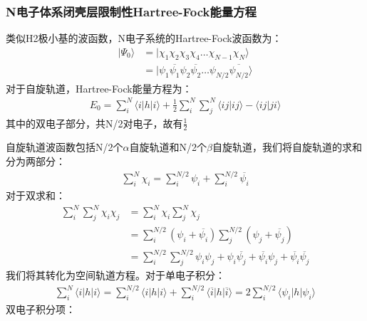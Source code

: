 \documentclass[12pt, a4paper, oneside]{ctexart}
\begin{document}
\subsubsection{N电子体系闭壳层限制性Hartree-Fock能量方程}
类似H2极小基的波函数，N电子系统的Hartree-Fock波函数为：
\begin{equation}
\begin{aligned}
|\Psi_0\rangle&=|\chi_1\chi_2\chi_3\chi_4\dots\chi_{N-1}\chi_N\rangle\\
			&=|\psi_1\overline{\psi_1}\psi_2\overline{\psi_2}\dots\psi_{N/2}\overline{\psi_{N/2}}\rangle
\end{aligned}
\end{equation}
对于自旋轨道，Hartree-Fock能量方程为：
\begin{equation}
\begin{aligned}
E_0=\sum_i^N\langle i|h|i\rangle+\frac12\sum_i^N\sum_j^N\langle ij|ij\rangle-\langle ij|ji\rangle
\end{aligned}
\end{equation}
其中的双电子部分，共N/2对电子，故有$\frac12$\par
自旋轨道波函数包括N/2个$\alpha$自旋轨道和N/2个$\beta$自旋轨道，我们将自旋轨道的求和分为两部分：
\begin{equation}
\begin{aligned}
\sum_i^N\chi_i=\sum_i^{N/2}\psi_i+\sum_i^{N/2}\overline{\psi_i}
\end{aligned}
\end{equation}
对于双求和：
\begin{equation}
\begin{aligned}
\sum_i^N\sum_j^N\chi_i\chi_j&=\sum_i^N\chi_i\sum_j^N\chi_j\\
&=\sum_i^{N/2}(\psi_i+\overline{\psi_i})\sum_j^{N/2}(\psi_j+\overline{\psi_j})\\
&=\sum_i^{N/2}\sum_j^{N/2}\psi_i\psi_j+\psi_i\overline{\psi_j}+\overline{\psi_i}\psi_j+\overline{\psi_i}\overline{\psi_j}
\end{aligned}
\end{equation}
我们将其转化为空间轨道方程。对于单电子积分：
\begin{equation}
\begin{aligned}
\sum_i^N\langle i|h|i\rangle=\sum_i^{N/2}\langle i|h|i\rangle+\sum_i^{N/2}\langle \overline{i}|h|\overline{i}\rangle=2\sum_i^{N/2}\langle\psi_i|h|\psi_i\rangle
\end{aligned}
\end{equation}
双电子积分项：
\end{document}
